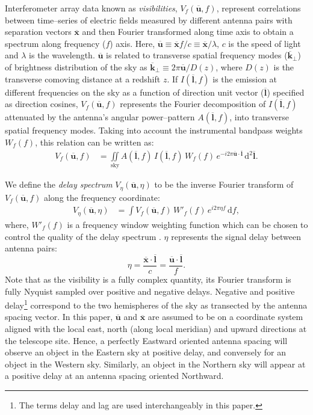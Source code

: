 \documentclass[preprint2,iop,numberedappendix]{emulateapj}
\newcommand{\dif}{\mathrm{d}}
\begin{document}
Interferometer array data known as {\it visibilities}, $V_f(\overline{\mathbf{u}},f)$, represent correlations between time--series of electric fields measured by different antenna pairs with separation vectors $\overline{\mathbf{x}}$ and then Fourier transformed along time axis to obtain a spectrum along frequency ($f$) axis. Here, $\overline{\mathbf{u}}\equiv \overline{\mathbf{x}}f/c \equiv \overline{\mathbf{x}}/\lambda$, $c$ is the speed of light and $\lambda$ is the wavelength. $\overline{\mathbf{u}}$ is related to transverse spatial frequency modes ($\overline{\mathbf{k}}_\perp$) of brightness distribution of the sky as $\overline{\mathbf{k}}_\perp \equiv 2\pi\overline{\mathbf{u}}/D(z)$, where $D(z)$ is the transverse comoving distance at a redshift $z$. If $I(\overline{\mathbf{l}},f)$ is the emission at different frequencies on the sky as a function of direction unit vector ($\overline{\mathbf{l}}$) specified as direction cosines, $V_f(\overline{\mathbf{u}},f)$ represents the Fourier decomposition of $I(\overline{\mathbf{l}},f)$ attenuated by the antenna's angular power--pattern $A(\overline{\mathbf{l}},f)$, into transverse spatial frequency modes. Taking into account the instrumental bandpass weights $W_f(f)$, this relation can be written as:
\begin{align}\label{eqn:obsvis}
  V_f(\overline{\mathbf{u}},f) &= \iint\limits_\textrm{sky} A(\overline{\mathbf{l}},f)\,I(\overline{\mathbf{l}},f)\,W_f(f)\,e^{-i2\pi \overline{\mathbf{u}}\cdot\overline{\mathbf{l}}}\,\dif^2 \overline{\mathbf{l}}.
\end{align}

We define the {\it delay spectrum} $V_\eta(\overline{\mathbf{u}},\eta)$ to be the inverse Fourier transform of $V_f(\overline{\mathbf{u}},f)$ along the frequency coordinate:
\begin{align}\label{eqn:delay-transform}
  V_\eta(\overline{\mathbf{u}},\eta) &= \int V_f(\overline{\mathbf{u}},f)\,W'_f(f)\,e^{i2\pi\eta f}\,\dif f,
\end{align}
where, $W'_f(f)$ is a frequency window weighting function which can be chosen to control the quality of the delay spectrum \citep{thy13,ved12}. $\eta$ represents the signal delay between antenna pairs:
\begin{equation}\label{eqn:delay}
  \eta = \frac{\overline{\mathbf{x}}\cdot\overline{\mathbf{l}}}{c} = \frac{\overline{\mathbf{u}}\cdot\overline{\mathbf{l}}}{f}.
\end{equation}
Note that as the visibility is a fully complex quantity, its Fourier transform is fully Nyquist sampled over positive and negative delays. Negative and positive delay\footnote{The terms delay and lag are used interchangeably in this paper.} correspond to the two hemispheres of the sky as transected by the antenna spacing vector. In this paper, $\overline{\mathbf{u}}$ and $\overline{\mathbf{x}}$ are assumed to be on a coordinate system aligned with the local east, north (along local meridian) and upward directions at the telescope site. Hence, a perfectly Eastward oriented antenna spacing will observe an object in the Eastern sky at positive delay, and conversely for an object in the Western sky. Similarly, an object in the Northern sky will appear at a positive delay at an antenna spacing oriented Northward.
\end{document}
